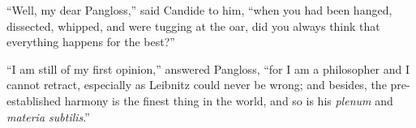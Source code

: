 ``Well, my dear Pangloss,'' said Candide to him, ``when you had been hanged, dissected, whipped, and were tugging at the oar, did you always think that everything happens for the best?''

``I am still of my first opinion,'' answered Pangloss, ``for I am a philosopher and I cannot retract, especially as Leibnitz could never be wrong; and besides, the pre-established harmony is the finest thing in the world, and so is his \textit{plenum} and \textit{materia subtilis}.''

